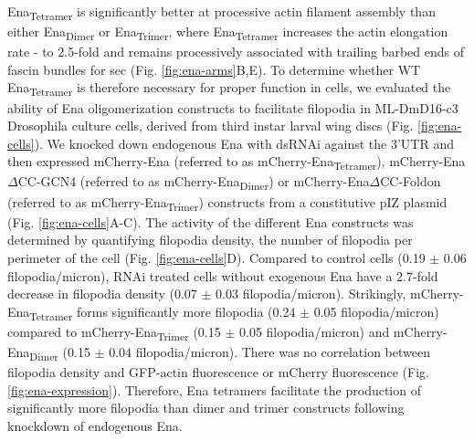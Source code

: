 Ena\textsubscript{Tetramer} is significantly better at processive actin filament assembly than either Ena\textsubscript{Dimer} or Ena\textsubscript{Trimer}, where Ena\textsubscript{Tetramer} increases the actin elongation rate - to 2.5-fold and remains processively associated with trailing barbed ends of fascin bundles for  sec (Fig. \ref{fig:ena-arms}B,E). To determine whether WT Ena\textsubscript{Tetramer} is therefore necessary for proper function in cells, we evaluated the ability of Ena oligomerization constructs to facilitate filopodia in ML-DmD16-c3 Drosophila culture cells, derived from third instar larval wing discs (Fig. \ref{fig:ena-cells}). We knocked down endogenous Ena with dsRNAi against the 3'UTR and then expressed mCherry-Ena (referred to as mCherry-Ena\textsubscript{Tetramer}), mCherry-Ena$\Delta$CC-GCN4 (referred to as mCherry-Ena\textsubscript{Dimer}) or mCherry-Ena$\Delta$CC-Foldon (referred to as mCherry-Ena\textsubscript{Trimer}) constructs from a constitutive pIZ plasmid (Fig. \ref{fig:ena-cells}A-C). The activity of the different Ena constructs was determined by quantifying filopodia density, the number of filopodia per perimeter of the cell (Fig. \ref{fig:ena-cells}D). Compared to control cells (0.19 $\pm$ 0.06 filopodia/micron), RNAi treated cells without exogenous Ena have a 2.7-fold decrease in filopodia density (0.07 $\pm$ 0.03 filopodia/micron). Strikingly, mCherry-Ena\textsubscript{Tetramer} forms significantly more filopodia (0.24 $\pm$ 0.05 filopodia/micron) compared to mCherry-Ena\textsubscript{Trimer} (0.15 $\pm$ 0.05 filopodia/micron) and mCherry-Ena\textsubscript{Dimer} (0.15 $\pm$ 0.04 filopodia/micron). There was no correlation between filopodia density and GFP-actin fluorescence or mCherry fluorescence (Fig. \ref{fig:ena-expression}). Therefore, Ena tetramers facilitate the production of significantly more filopodia than dimer and trimer constructs following knockdown of endogenous Ena.

